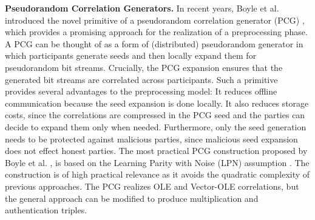 \textbf{Pseudorandom Correlation Generators.} In recent years, Boyle et al. introduced the novel primitive of a pseudorandom correlation generator (PCG) \cite{boyle2019efficient, boyle2020efficient}, which provides a promising approach for the realization of a preprocessing phase. A PCG can be thought of as a form of (distributed) pseudorandom generator in which participants generate seeds and then locally expand them for pseudorandom bit streams. Crucially, the PCG expansion ensures that the generated bit streams are correlated across participants. Such a primitive provides several advantages to the preprocessing model: It reduces offline communication because the seed expansion is done locally. It also reduces storage costs, since the correlations are compressed in the PCG seed and the parties can decide to expand them only when needed. Furthermore, only the seed generation needs to be protected against malicious parties, since malicious seed expansion does not effect honest parties. The most practical PCG construction proposed by Boyle et al. \cite{boyle2020efficient}, is based on the Learning Parity with Noise (LPN) assumption \cite{pietrzak2012cryptography}. The construction is of high practical relevance as it avoids the quadratic complexity of previous approaches. The PCG realizes OLE and Vector-OLE correlations, but the general approach can be modified to produce multiplication and authentication triples.
\\\\
